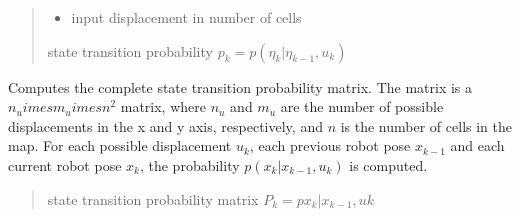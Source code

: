 \documentclass[letterpaper,10pt,english]{sphinxmanual}
\begin{document}
\begin{fulllineitems}
\begin{fulllineitems}
\begin{quote}
\begin{description}
\begin{itemize}
\item {} 
\sphinxAtStartPar
{} \textendash{} input displacement in number of cells

\end{itemize}

\sphinxAtStartPar
state transition probability \(p_k=p(\eta_k | \eta_{k-1}, u_k)\)

\end{description}\end{quote}

\end{fulllineitems}


\begin{fulllineitems}
\label{\detokenize{GridLocalization:GL_3DOFDifferentialDrive.GL_3DOFDifferentialDrive.StateTransitionProbability}}
\pysigstartsignatures
{}
\pysigstopsignatures
\sphinxAtStartPar
Computes the complete state transition probability matrix. The matrix is a \(n_u   imes m_u        imes n^2\) matrix,
where \(n_u\) and \(m_u\) are the number of possible displacements in the x and y axis, respectively, and
\(n\) is the number of cells in the map. For each possible displacement \(u_k\), each previous robot pose
\({x_{k-1}}\) and each current robot pose \({x_k}\), the probability \(p(x_k|x_{k-1},u_k)\) is computed.
\begin{quote}\begin{description}
\sphinxAtStartPar
state transition probability matrix \(P_k=p{x_k|x_{k-1},uk}\)

\end{description}\end{quote}

\end{fulllineitems}



\end{fulllineitems}
\end{document}
